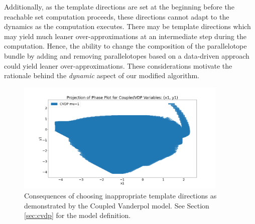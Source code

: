 Additionally, as the template directions are set at the beginning before the reachable set computation proceeds, these directions cannot adapt to the dynamics as the computation executes.
%
There may be template directions which may yield much leaner over-approximations at an intermediate step during the computation.
%
Hence, the ability to change the composition of the parallelotope bundle by adding and removing parallelotopes based on a data-driven approach could yield leaner over-approximations.
%
These considerations motivate the rationale behind the \emph{dynamic} aspect of our modified algorithm.

\begin{figure}[t!]
\centering
\includegraphics[width= 0.9\textwidth]{figures/cvdp20.png}
\caption{Consequences of choosing inappropriate template directions as demonstrated by the Coupled Vanderpol model. See Section \ref{sec:cvdp} for the model definition.}
\label{fig:bloat_cvdp}
\end{figure}

